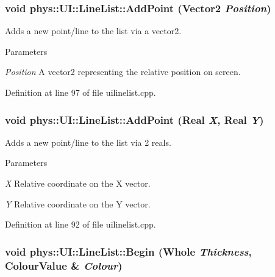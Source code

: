 \hypertarget{classphys_1_1UI_1_1LineList_ac83ad81a0df3c6a8a70ef0dd6dd4273c}{
\subsubsection[{AddPoint}]{\setlength{\rightskip}{0pt plus 5cm}void phys::UI::LineList::AddPoint ({\bf Vector2} {\em Position})}}
\label{d7/de8/classphys_1_1UI_1_1LineList_ac83ad81a0df3c6a8a70ef0dd6dd4273c}


Adds a new point/line to the list via a vector2. 


\begin{DoxyParams}{Parameters}
\item[{\em Position}]A vector2 representing the relative position on screen. \end{DoxyParams}


Definition at line 97 of file uilinelist.cpp.

\hypertarget{classphys_1_1UI_1_1LineList_afbd4593215f51882f4540229e14da807}{
\subsubsection[{AddPoint}]{\setlength{\rightskip}{0pt plus 5cm}void phys::UI::LineList::AddPoint ({\bf Real} {\em X}, \/  {\bf Real} {\em Y})}}
\label{d7/de8/classphys_1_1UI_1_1LineList_afbd4593215f51882f4540229e14da807}


Adds a new point/line to the list via 2 reals. 


\begin{DoxyParams}{Parameters}
\item[{\em X}]Relative coordinate on the X vector. \item[{\em Y}]Relative coordinate on the Y vector. \end{DoxyParams}


Definition at line 92 of file uilinelist.cpp.

\hypertarget{classphys_1_1UI_1_1LineList_af9768ac753852b412a11c2e77bad0dd6}{
\subsubsection[{Begin}]{\setlength{\rightskip}{0pt plus 5cm}void phys::UI::LineList::Begin ({\bf Whole} {\em Thickness}, \/  {\bf ColourValue} \& {\em Colour})}}
\label{d7/de8/classphys_1_1UI_1_1LineList_af9768ac753852b412a11c2e77bad0dd6}


